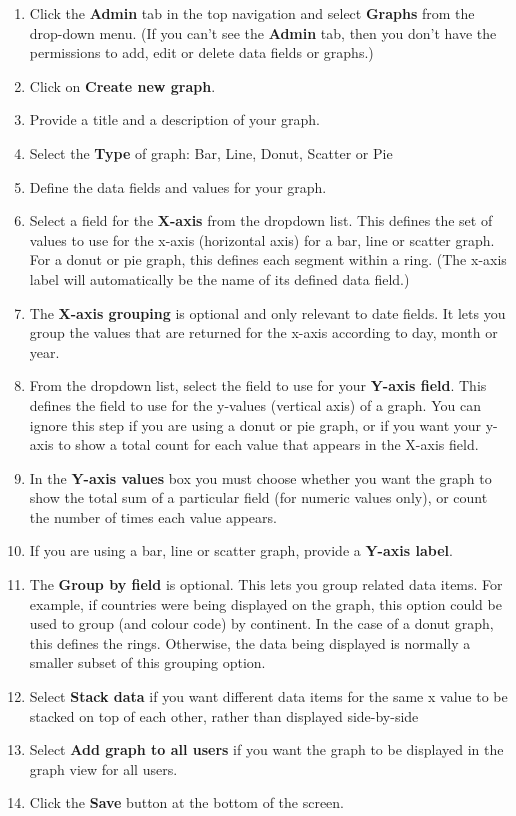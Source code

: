 \documentclass{ctrlo-int-toc}
\begin{document}
\begin{admin}
\begin{enumerate}
\item Click the \textbf{Admin} tab in the top navigation and select \textbf{Graphs} from the drop-down menu. (If you can't see the \textbf{Admin} tab, then you don't have the permissions to add, edit or delete data fields or graphs.)
\item Click on \textbf{Create new graph}.
\item Provide a title and a description of your graph. 
\item Select the \textbf{Type} of graph: Bar, Line, Donut, Scatter or Pie
\item Define the data fields and values for your graph. 
\item Select a field for the \textbf{X-axis} from the dropdown list. This defines the set of values to use for the x-axis (horizontal axis) for a bar, line or scatter graph. For a donut or pie graph, this defines each segment within a ring. (The x-axis label will automatically be the name of its defined data field.)
\item The \textbf{X-axis grouping} is optional and only relevant to date fields. It lets you group the values that are returned for the x-axis according to day, month or year. 
\item From the dropdown list, select the field to use for your \textbf{Y-axis field}. This defines the field to use for the y-values (vertical axis) of a graph. You can ignore this step if you are using a donut or pie graph, or if you want your y-axis to show a total count for each value that appears in the X-axis field. \ 
\item In the \textbf{Y-axis values} box you must choose whether you want the graph to show the total sum of a particular field (for numeric values only), or count the number of times each value appears. 
\item If you are using a bar, line or scatter graph, provide a \textbf{Y-axis label}.
\item The \textbf{Group by field} is optional. This lets you group related data items. For example, if countries were being displayed on the graph, this option could be used to group (and colour code) by continent. In the case of a donut graph, this defines the rings. Otherwise, the data being displayed is normally a smaller subset of this grouping option.
\item Select \textbf{Stack data} if you want different data items for the same x value to be stacked on top of each other, rather than displayed side-by-side
\item Select \textbf{Add graph to all users} if you want the graph to be displayed in the graph view for all users.
\item Click the \textbf{Save} button at the bottom of the screen.
\end{enumerate}

\end{admin}
\end{document}
